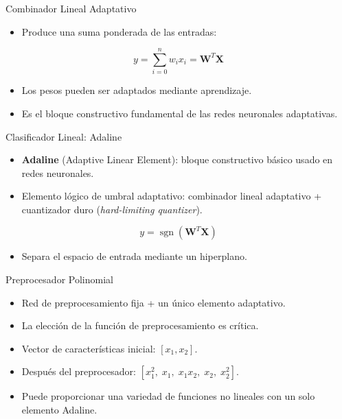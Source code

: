 \documentclass[aspectratio=169,utf8,spanish]{beamer}
\DeclareMathOperator{\sgn}{sgn}
\begin{document}
\begin{frame}{Combinador Lineal Adaptativo}
  \begin{itemize}
    \item Produce una suma ponderada de las entradas:
  \end{itemize}
  \begin{equation*}
    y = \sum_{i=0}^{n} w_i x_i = \mathbf{W}^T \mathbf{X}
  \end{equation*}
  \begin{itemize}
    \item Los pesos pueden ser adaptados mediante aprendizaje.
    \item Es el bloque constructivo fundamental de las redes neuronales adaptativas.
  \end{itemize}
\end{frame}

\begin{frame}{Clasificador Lineal: Adaline}
  \begin{itemize}
    \item \textbf{Adaline} (Adaptive Linear Element): bloque constructivo básico usado en redes neuronales.
    \item Elemento lógico de umbral adaptativo: combinador lineal adaptativo + cuantizador duro (\textit{hard-limiting quantizer}).
  \end{itemize}
  \begin{equation*}
    y = \sgn(\mathbf{W}^T \mathbf{X})
  \end{equation*}
  \begin{itemize}
    \item Separa el espacio de entrada mediante un hiperplano.
  \end{itemize}
\end{frame}

\begin{frame}{Preprocesador Polinomial}
  \begin{itemize}
    \item Red de preprocesamiento fija + un único elemento adaptativo.
    \item La elección de la función de preprocesamiento es crítica.
  \end{itemize}
  \begin{itemize}
    \item Vector de características inicial: $[x_1, x_2]$.
    \item Después del preprocesador: $[x_1^2,\; x_1,\; x_1x_2,\; x_2,\; x_2^2]$.
  \end{itemize}
  \begin{itemize}
    \item Puede proporcionar una variedad de funciones no lineales con un solo elemento Adaline.
  \end{itemize}
\end{frame}
\end{document}
